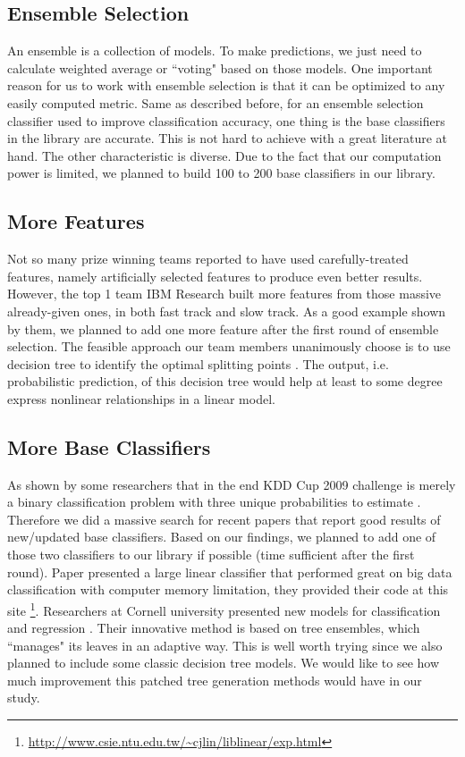 \documentclass[journal]{IEEEtran}
\begin{document}
\subsection{Ensemble Selection}
An ensemble is a collection of models. To make predictions, we just need to calculate weighted average or ``voting" based on those models. One important reason for us to work with ensemble selection is that it can be optimized to any easily computed metric. Same as described before, for an ensemble selection classifier used to improve classification accuracy, one thing is the base classifiers in the library are accurate. This is not hard to achieve with a great literature at hand. The other characteristic is diverse. Due to the fact that our computation power is limited, we planned to build 100 to 200 base classifiers in our library.

\subsection{More Features}
Not so many prize winning teams reported to have used carefully-treated features, namely artificially selected features to produce even better results. However, the top 1 team IBM Research built more features from those massive already-given ones, in both fast track and slow track. As a good example shown by them, we planned to add one more feature after the first round of ensemble selection. The feasible approach our team members unanimously choose is to use decision tree to identify the optimal splitting points \cite{Ref:WinningtheKDDCupIBMResearch}. The output, i.e. probabilistic prediction, of this decision tree would help at least to some degree express nonlinear relationships in a linear model.

\subsection{More Base Classifiers}
As shown by some researchers that in the end KDD Cup 2009 challenge is merely a binary classification problem with three unique probabilities to estimate \cite{Ref:AnEnsembleOfThreeClassifiersForKDD2009}. Therefore we did a massive search for recent papers that report good results of new/updated base classifiers. Based on our findings, we planned to add one of those two classifiers to our library if possible (time sufficient after the first round). Paper \cite{Ref:LargeLinearClassificationWhen} presented a large linear classifier that performed great on big data classification with computer memory limitation, they provided their code at this site \footnote{\url{http://www.csie.ntu.edu.tw/~cjlin/liblinear/exp.html}}. Researchers at Cornell university presented new models for classification and regression \cite{Ref:IntelligibleModelsForClassificationAndRegression}. Their innovative method is based on tree ensembles, which ``manages" its leaves in an adaptive way. This is well worth trying since we also planned to include some classic decision tree models. We would like to see how much improvement this patched tree generation methods would have in our study.
\end{document}
